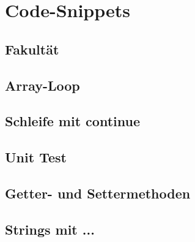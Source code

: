 \section{Code-Snippets}

\subsection{Fakultät}
    

\subsection{Array-Loop}{\label{Array-Loop}}
    

\subsection{Schleife mit continue}

\subsection{Unit Test}{\label{Unit-Test}}

\subsection{Getter- und Settermethoden}{\label{GetSet}}

\subsection{Strings mit ...}
